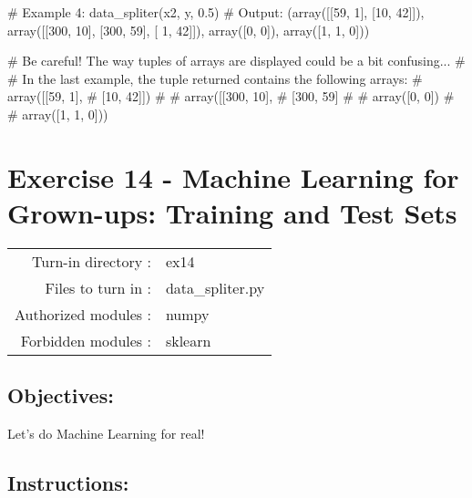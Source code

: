 \documentclass[]{article}
\newenvironment{Shaded}{\begin{snugshade}}{\end{snugshade}}
\newcommand{\CommentTok}[1]{\textcolor[rgb]{0.48,0.49,0.49}{#1}}
\newcommand{\DecValTok}[1]{\textcolor[rgb]{0.96,0.45,0.00}{#1}}
\newcommand{\FloatTok}[1]{\textcolor[rgb]{0.96,0.45,0.00}{#1}}
\newcommand{\NormalTok}[1]{\textcolor[rgb]{0.81,0.81,0.76}{#1}}
\begin{document}
\begin{Shaded}
\begin{Highlighting}[]
\CommentTok{# Example 4:}
\NormalTok{data_spliter(x2, y, }\FloatTok{0.5}\NormalTok{)}
\CommentTok{# Output:}
\NormalTok{(array([[}\DecValTok{59}\NormalTok{,  }\DecValTok{1}\NormalTok{],}
\NormalTok{        [}\DecValTok{10}\NormalTok{, }\DecValTok{42}\NormalTok{]]), array([[}\DecValTok{300}\NormalTok{,  }\DecValTok{10}\NormalTok{],}
\NormalTok{        [}\DecValTok{300}\NormalTok{,  }\DecValTok{59}\NormalTok{],}
\NormalTok{        [  }\DecValTok{1}\NormalTok{,  }\DecValTok{42}\NormalTok{]]), array([}\DecValTok{0}\NormalTok{, }\DecValTok{0}\NormalTok{]), array([}\DecValTok{1}\NormalTok{, }\DecValTok{1}\NormalTok{, }\DecValTok{0}\NormalTok{]))}

\CommentTok{# Be careful! The way tuples of arrays are displayed could be a bit confusing... }
\CommentTok{# }
\CommentTok{# In the last example, the tuple returned contains the following arrays: }
\CommentTok{# array([[59,  1],}
\CommentTok{# [10, 42]])}
\CommentTok{#}
\CommentTok{# array([[300,  10],}
\CommentTok{# [300,  59]}
\CommentTok{#}
\CommentTok{# array([0, 0])}
\CommentTok{#}
\CommentTok{# array([1, 1, 0]))}
\end{Highlighting}
\end{Shaded}

\clearpage

\hypertarget{exercise-14---machine-learning-for-grown-ups-training-and-test-sets-1}{%
\section{Exercise 14 - Machine Learning for Grown-ups: Training and Test
Sets}\label{exercise-14---machine-learning-for-grown-ups-training-and-test-sets-1}}

\begin{longtable}[]{@{}rl@{}}
\toprule
\endhead
Turn-in directory : & ex14\tabularnewline
Files to turn in : & data\_spliter.py\tabularnewline
Authorized modules : & numpy\tabularnewline
Forbidden modules : & sklearn\tabularnewline
\bottomrule
\end{longtable}

\hypertarget{objectives-11}{%
\subsection{Objectives:}\label{objectives-11}}

Let's do Machine Learning for real!

\hypertarget{instructions-14}{%
\subsection{Instructions:}\label{instructions-14}}
\end{document}
